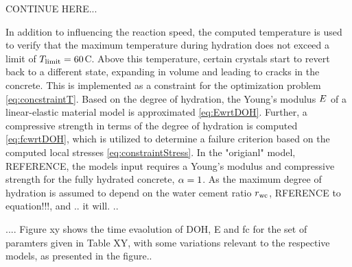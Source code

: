 CONTINUE HERE...

In addition to influencing the reaction speed, the computed temperature is used to verify that the maximum temperature during hydration does not exceed a limit of $T_{\text{limit}} = 60$\textdegree C.
Above this temperature, certain crystals start to revert back to a different state, expanding in volume and leading to cracks in the concrete.
This is implemented as a constraint for the optimization problem \eqref{eq:concstraintT}.
Based on the degree of hydration, the Young's modulus $E$ of a linear-elastic material model
is approximated \eqref{eq:EwrtDOH}.
Further, a compressive strength in terms of the degree of hydration is computed \eqref{eq:fcwrtDOH}, which is utilized to determine a failure criterion based on the computed local stresses \eqref{eq:constraintStress}.
In the "origianl" model, REFERENCE, the models input requires a Young's modulus and compressive strength for the fully hydrated concrete, $\alpha = 1$.
As the maximum degree of hydration is assumed to depend on the water cement ratio $r_{\text{wc}}$, RFERENCE to equation!!!, and .. it will.
..  


....
Figure xy shows the time evaolution of DOH, E and fc for the set of paramters given in Table XY, with some variations relevant to the respective models, as presented in the figure..



